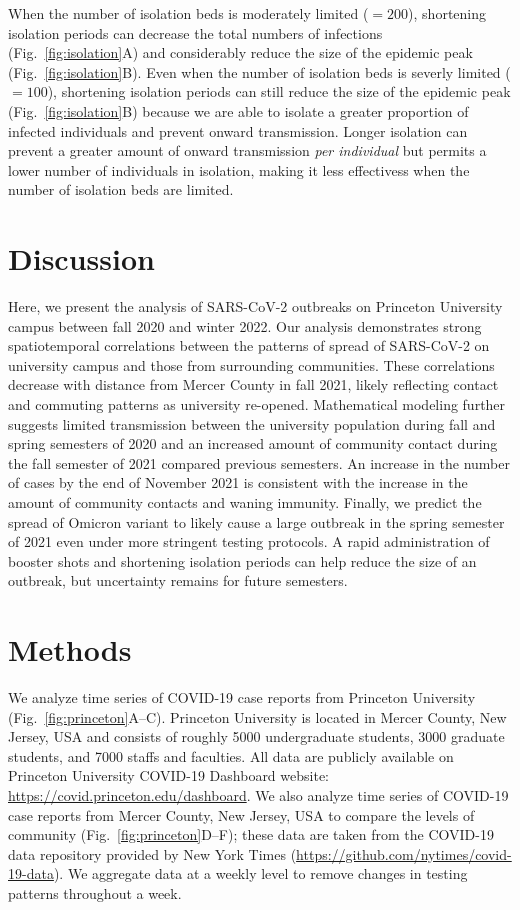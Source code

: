 \documentclass[12pt]{article}
\newcommand{\fref}[1]{Fig.~\ref{fig:#1}}
\begin{document}
When the number of isolation beds is moderately limited ($=200$), shortening isolation periods can decrease the total numbers of infections (\fref{isolation}A) and considerably reduce the size of the epidemic peak (\fref{isolation}B). 
Even when the number of isolation beds is severly limited ($=100$), shortening isolation periods can still reduce the size of the epidemic peak (\fref{isolation}B) because we are able to isolate a greater proportion of infected individuals and prevent onward transmission.
Longer isolation can prevent a greater amount of onward transmission \emph{per individual} but permits a lower number of individuals in isolation, making it less effectivess when the number of isolation beds are limited.

\section{Discussion}

Here, we present the analysis of SARS-CoV-2 outbreaks on Princeton University campus between fall 2020 and winter 2022.
Our analysis demonstrates strong spatiotemporal correlations between the patterns of spread of SARS-CoV-2 on university campus and those from surrounding communities.
These correlations decrease with distance from Mercer County in fall 2021, likely reflecting contact and commuting patterns as university re-opened.
Mathematical modeling further suggests limited transmission between the university population during fall and spring semesters of 2020 and an increased amount of community contact during the fall semester of 2021 compared previous semesters.
An increase in the number of cases by the end of November 2021 is consistent with the increase in the amount of community contacts and waning immunity.
Finally, we predict the spread of Omicron variant to likely cause a large outbreak in the spring semester of 2021 even under more stringent testing protocols.
A rapid administration of booster shots and shortening isolation periods can help reduce the size of an outbreak, but uncertainty remains for future semesters.




\section{Methods}


We analyze time series of COVID-19 case reports from Princeton University (\fref{princeton}A--C).
Princeton University is located in Mercer County, New Jersey, USA and consists of roughly 5000 undergraduate students, 3000 graduate students, and 7000 staffs and faculties.
All data are publicly available on Princeton University COVID-19 Dashboard website: \url{https://covid.princeton.edu/dashboard}.
We also analyze time series of COVID-19 case reports from Mercer County, New Jersey, USA to compare the levels of community (\fref{princeton}D--F);
these data are taken from the COVID-19 data repository provided by New York Times (\url{https://github.com/nytimes/covid-19-data}).
We aggregate data at a weekly level to remove changes in testing patterns throughout a week.
\end{document}
